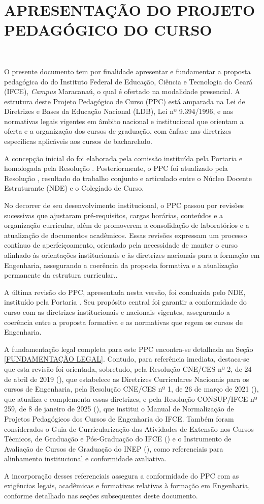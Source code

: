 \clearpage
\section{\MakeUppercase{Apresentação do Projeto Pedagógico do Curso}}
~ %

O presente documento tem por finalidade apresentar e fundamentar a proposta pedagógica do \NOMECURSO do Instituto Federal de Educação, Ciência e Tecnologia do Ceará (IFCE), \textit{Campus} Maracanaú, o qual é ofertado na modalidade presencial. A estrutura deste Projeto Pedagógico de Curso (PPC) está amparada na Lei de Diretrizes e Bases da Educação Nacional (LDB), Lei nº 9.394/1996, e nas normativas legais vigentes em âmbito nacional e institucional que orientam a oferta e a organização dos cursos de graduação, com ênfase nas diretrizes específicas aplicáveis aos cursos de bacharelado.

A concepção inicial do \textbf{\NOMECURSO} foi elaborada pela comissão instituída pela Portaria \textbf{\PORTARIACOMISSAO} e homologada pela Resolução \textbf{\RESOLUCAOAPROVACAO}. Posteriormente, o PPC foi atualizado pela Resolução \textbf{\RESOLUCAOAPROVACAONOVA}, resultado do trabalho conjunto e articulado entre o Núcleo Docente Estruturante (NDE) e o Colegiado de Curso. 

No decorrer de seu desenvolvimento institucional, o PPC passou por revisões sucessivas que ajustaram pré-requisitos, cargas horárias, conteúdos e a organização curricular, além de promoverem a consolidação de laboratórios e a atualização de documentos acadêmicos. Essas revisões expressam um processo contínuo de aperfeiçoamento, orientado pela necessidade de manter o curso alinhado às orientações institucionais e às diretrizes nacionais para a formação em Engenharia, assegurando a coerência da proposta formativa e a atualização permanente da estrutura curricular..

A última revisão do PPC, apresentada nesta versão, foi conduzida pelo NDE, instituído pela Portaria \PORTARIANDEATUAL. Seu propósito central foi garantir a conformidade do curso com as diretrizes institucionais e nacionais vigentes, assegurando a coerência entre a proposta formativa e as normativas que regem os cursos de Engenharia.

A fundamentação legal completa para este PPC encontra-se detalhada na Seção \ref{FUNDAMENTAÇÃO LEGAL}. Contudo, para referência imediata, destaca-se que esta revisão foi orientada, sobretudo, pela Resolução CNE/CES nº 2, de 24 de abril de 2019 (), que estabelece as Diretrizes Curriculares Nacionais para os cursos de Engenharia, pela Resolução CNE/CES nº 1, de 26 de março de 2021 (), que atualiza e complementa essas diretrizes, e pela Resolução CONSUP/IFCE nº 259, de 8 de janeiro de 2025 (), que institui o Manual de Normalização de Projetos Pedagógicos dos Cursos de Engenharia do IFCE. Também foram considerados o Guia de Curricularização das Atividades de Extensão nos Cursos Técnicos, de Graduação e Pós-Graduação do IFCE () e o Instrumento de Avaliação de Cursos de Graduação do INEP (), como referenciais para alinhamento institucional e conformidade avaliativa.


A incorporação desses referenciais assegura a conformidade do PPC com as exigências legais, acadêmicas e formativas relativas à formação em Engenharia, conforme detalhado nas seções subsequentes deste documento.
